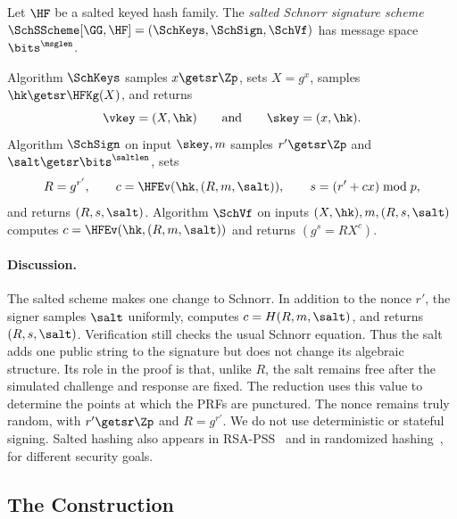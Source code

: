 \begin{construction} \label{constr-salted-sch}
Let $\HF$ be a salted keyed hash family. The \emph{salted Schnorr signature scheme} $\SchSScheme[\GG,\HF]=(\SchKeys,\SchSign,\SchVf)$ has message space $\bits^{\msglen}$.

Algorithm $\SchKeys$ samples $x\getsr\Zp$, sets $X=g^x$, samples $\hk\getsr\HFKg(X)$, and returns
$$
\vkey=(X,\hk)
\qquad\text{and}\qquad
\skey=(x,\hk).
$$
Algorithm $\SchSign$ on input $\skey,m$ samples $r'\getsr\Zp$ and $\salt\getsr\bits^{\saltlen}$, sets
$$
R=g^{r'},
\qquad
c=\HFEv(\hk,(R,m,\salt)),
\qquad
s=(r'+cx)\bmod p,
$$
and returns $(R,s,\salt)$. Algorithm $\SchVf$ on inputs $(X,\hk),m,(R,s,\salt)$ computes $c=\HFEv(\hk,(R,m,\salt))$ and returns $(g^s=RX^c)$.
\end{construction}

\paragraph*{Discussion.} The salted scheme makes one change to Schnorr. In addition to the nonce $r'$, the signer samples $\salt$ uniformly, computes $c=H(R,m,\salt)$, and returns $(R,s,\salt)$. Verification still checks the usual Schnorr equation. Thus the salt adds one public string to the signature but does not change its algebraic structure. Its role in the proof is that, unlike $R$, the salt remains free after the simulated challenge and response are fixed. The reduction uses this value to determine the points at which the PRFs are punctured. The nonce remains truly random, with $r'\getsr\Zp$ and $R=g^{r'}$. We do not use deterministic or stateful signing. Salted hashing also appears in RSA-PSS~\cite{EC:BelRog96} and in randomized hashing~\cite{C:HalKra06}, for different security goals.

\subsection{The Construction} \label{sec-salted-constr}

